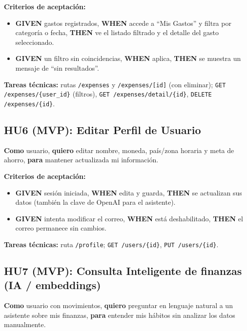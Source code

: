 \documentclass[12pt,letterpaper]{article}
\begin{document}
\textbf{Criterios de aceptaci\'on:}
\begin{itemize}[leftmargin=1.2cm]
  \item \textbf{GIVEN} gastos registrados, \textbf{WHEN} accede a ``Mis Gastos'' y
        filtra por categor\'ia o fecha, \textbf{THEN} ve el listado filtrado y el
        detalle del gasto seleccionado.
  \item \textbf{GIVEN} un filtro sin coincidencias, \textbf{WHEN} aplica, \textbf{THEN}
        se muestra un mensaje de ``sin resultados''.
\end{itemize}
\textbf{Tareas t\'ecnicas:} rutas \texttt{/expenses} y \texttt{/expenses/[id]} (con
eliminar); \texttt{GET /expenses/\{user\_id\}} (filtros),
\texttt{GET /expenses/detail/\{id\}}, \texttt{DELETE /expenses/\{id\}}.

\subsection{HU6 (MVP): Editar Perfil de Usuario}
\textbf{Como} usuario, \textbf{quiero} editar nombre, moneda, pa\'is/zona horaria y
meta de ahorro, \textbf{para} mantener actualizada mi informaci\'on.

\textbf{Criterios de aceptaci\'on:}
\begin{itemize}[leftmargin=1.2cm]
  \item \textbf{GIVEN} sesi\'on iniciada, \textbf{WHEN} edita y guarda, \textbf{THEN}
        se actualizan sus datos (tambi\'en la clave de OpenAI para el asistente).
  \item \textbf{GIVEN} intenta modificar el correo, \textbf{WHEN} est\'a deshabilitado,
        \textbf{THEN} el correo permanece sin cambios.
\end{itemize}
\textbf{Tareas t\'ecnicas:} ruta \texttt{/profile}; \texttt{GET /users/\{id\}},
\texttt{PUT /users/\{id\}}.

\subsection{HU7 (MVP): Consulta Inteligente de finanzas (IA / embeddings)}
\textbf{Como} usuario con movimientos, \textbf{quiero} preguntar en lenguaje natural
a un asistente sobre mis finanzas, \textbf{para} entender mis h\'abitos sin analizar
los datos manualmente.
\end{document}

